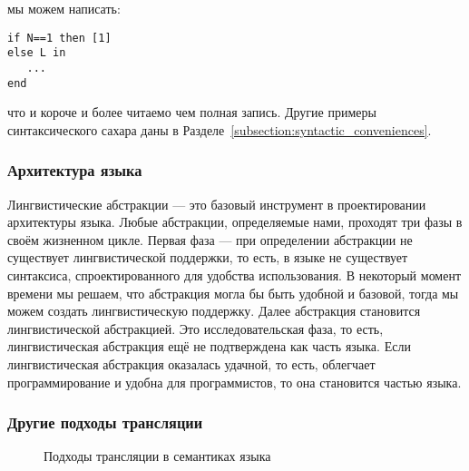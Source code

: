 мы можем написать:

\begin{lstlisting}
if N==1 then [1]
else L in
   ...
end
\end{lstlisting}

что и короче и более читаемо чем полная запись. Другие примеры синтаксического сахара даны в Разделе~\ref{subsection:syntactic_conveniences}.

\subsubsection{Архитектура языка}

Лингвистические абстракции --- это базовый инструмент в проектировании архитектуры языка. Любые абстракции, определяемые нами, проходят три фазы в своём жизненном цикле. Первая фаза --- при определении абстракции не существует лингвистической поддержки, то есть, в языке не существует синтаксиса, спроектированного для удобства использования. В некоторый момент времени мы решаем, что абстракция могла бы быть удобной и базовой, тогда мы можем создать лингвистическую поддержку. Далее абстракция становится лингвистической абстракцией. Это исследовательская фаза, то есть, лингвистическая абстракция ещё не подтверждена как часть языка. Если лингвистическая абстракция оказалась удачной, то есть, облегчает программирование и удобна для программистов, то она становится частью языка.

\subsubsection{Другие подходы трансляции}

\begin{figure}
\caption{Подходы трансляции в семантиках языка}
\label{figure:translation_approaches_to_language_semantics}
\end{figure}

